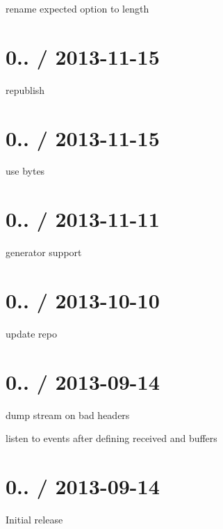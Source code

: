 \begin{DoxyItemize}
\item rename {\ttfamily expected} option to {\ttfamily length}
\end{DoxyItemize}

\section*{0.. / 2013-\/11-\/15 }


\begin{DoxyItemize}
\item republish
\end{DoxyItemize}

\section*{0.. / 2013-\/11-\/15 }


\begin{DoxyItemize}
\item use bytes
\end{DoxyItemize}

\section*{0.. / 2013-\/11-\/11 }


\begin{DoxyItemize}
\item generator support
\end{DoxyItemize}

\section*{0.. / 2013-\/10-\/10 }


\begin{DoxyItemize}
\item update repo
\end{DoxyItemize}

\section*{0.. / 2013-\/09-\/14 }


\begin{DoxyItemize}
\item dump stream on bad headers
\item listen to events after defining received and buffers
\end{DoxyItemize}

\section*{0.. / 2013-\/09-\/14 }


\begin{DoxyItemize}
\item Initial release 
\end{DoxyItemize}